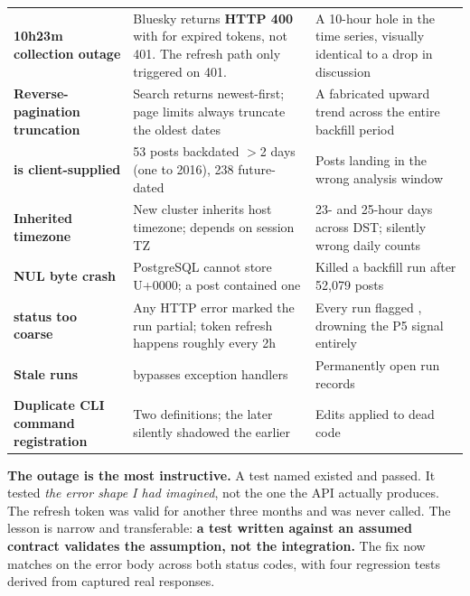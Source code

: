 \documentclass[11pt]{article}
\begin{document}
\begin{center}
\small
\begin{tabularx}{\textwidth}{@{}>{\raggedright\arraybackslash}p{} L L@{}}
\toprule
{} &  &  \\
\midrule
\textbf{10h23m collection outage} &
  Bluesky returns \textbf{HTTP 400} with  for
  expired tokens, not 401. The refresh path only triggered on 401. &
  A 10-hour hole in the time series, visually identical to a drop in discussion \\
\textbf{Reverse-pagination truncation} &
  Search returns newest-first; page limits always truncate the oldest dates &
  A fabricated upward trend across the entire backfill period \\
\textbf{ is client-supplied} &
  53 posts backdated $>$2 days (one to 2016), 238 future-dated &
  Posts landing in the wrong analysis window \\
\textbf{Inherited  timezone} &
  New cluster inherits host timezone;  depends on session TZ &
  23- and 25-hour days across DST; silently wrong daily counts \\
\textbf{NUL byte crash} &
  PostgreSQL cannot store U+0000; a post contained one &
  Killed a backfill run after 52{,}079 posts \\
\textbf{ status too coarse} &
  Any HTTP error marked the run partial; token refresh happens roughly every 2h &
  Every run flagged , drowning the P5 signal entirely \\
\textbf{Stale  runs} &
   bypasses exception handlers &
  Permanently open run records \\
\textbf{Duplicate CLI command registration} &
  Two  definitions; the later silently shadowed the earlier &
  Edits applied to dead code \\
\bottomrule
\end{tabularx}
\end{center}

\vspace{0.6em}
\begin{warnbox}
\textbf{The outage is the most instructive.} A test named
 existed and passed. It tested
\emph{the error shape I had imagined}, not the one the API actually produces.
The refresh token was valid for another three months and was never called. The
lesson is narrow and transferable: \textbf{a test written against an assumed
contract validates the assumption, not the integration.} The fix now matches on
the error body across both status codes, with four regression tests derived from
captured real responses.
\end{warnbox}
\end{document}

